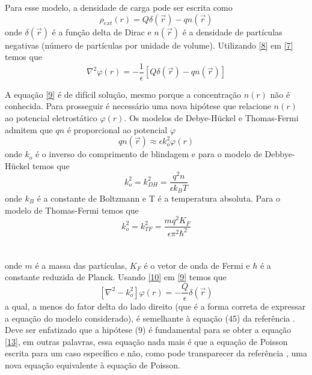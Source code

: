 \documentclass[brazilian,10.7pt,a4paper]{article}
\begin{document}
\begin{multicols}{2}
\par Para esse modelo, a densidade de carga pode ser escrita como
\\
\begin{equation}\label{8}
\rho_{ext}(r)=Q\delta(\vec{r})-qn(\vec{r})
\end{equation}
onde $\delta(\vec{r})$ é a função delta de Dirac e $n(\vec{r})$ é a densidade de partículas negativas (número de partículas por unidade de volume). Utilizando \eqref{8} em \eqref{7} temos que
\\
\begin{equation}\label{9}
\nabla^{2}\varphi(r)=-\frac{1}{\epsilon}[Q\delta(\vec{r})-qn(\vec{r})]
\end{equation}
\par A equação \eqref{9} é de difícil solução, mesmo porque a concentração $n(r)$ não é conhecida. Para prosseguir é necessário uma nova hipótese que relacione $n(r)$ ao potencial eletrostático $\varphi(r)$. Os modelos de Debye-Hückel e Thomas-Fermi admitem que $qn$ é proporcional ao potencial $\varphi$
\\
\begin{equation}\label{10}
qn(\vec{r})\approx \epsilon k^{2}_{o}\varphi(r)
\end{equation}
onde $k_{o}$ é o inverso do comprimento de blindagem e para o modelo de Debbye-Hückel temos que
\\
\begin{equation}\label{11}
k^{2}_{o}=k^{2}_{DH}=\frac{q^{2}n}{\epsilon k_{B}T}
\end{equation}
onde $k_{B}$ é a constante de Boltzmann e T é a temperatura absoluta. Para o modelo de Thomas-Fermi temos que
\\
\begin{equation}\label{12}
k^{2}_{o}=k^{2}_{TF}=\frac{mq^{2}K_{F}}{\epsilon\pi^{2}\hbar^{2}}
\end{equation}
\\
\\
onde $m$ é a massa das partículas, $K_{F}$ é o vetor de onda de Fermi e $\hbar$ é a constante reduzida de Planck. Usando \eqref{10} em \eqref{9} temos que
\\
\begin{equation}\label{13}
[\nabla^{2}-k^{2}_{o}]\varphi(r)=-\frac{Q}{\epsilon}\delta(\vec{r})
\end{equation}
a qual, a menos do fator delta do lado direito (que é a forma correta de expressar a equação do modelo considerado), é semelhante à equação (45) da referência \cite{ramos}. Deve ser enfatizado que a hipótese (9) é fundamental para se obter a equação \eqref{13}, em outras palavras, essa equação nada mais é que a equação de Poisson escrita para um caso específico e não, como pode transparecer da referência \cite{ramos}, uma nova equação equivalente à equação de Poisson.

\end{multicols}
\end{document}
